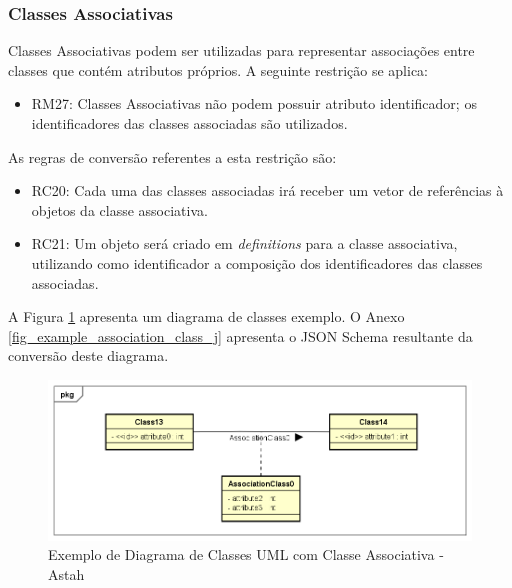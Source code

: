 
\subsubsection{Classes Associativas}

Classes Associativas podem ser utilizadas para representar associações entre classes que contém atributos próprios. A seguinte restrição se aplica:

\begin{itemize}
    \item RM27: Classes Associativas não podem possuir atributo identificador; os identificadores das classes associadas são utilizados.
\end{itemize}

As regras de conversão referentes a esta restrição são:

\begin{itemize}
    \item RC20: Cada uma das classes associadas irá receber um vetor de referências à objetos da classe associativa.
    
    \item RC21: Um objeto será criado em \textit{definitions} para a classe associativa, utilizando como identificador a composição dos identificadores das classes associadas.
\end{itemize}

A Figura \ref{fig_example_association_class} apresenta um diagrama de classes exemplo. O Anexo \ref{fig_example_association_class_j} apresenta o JSON Schema resultante da conversão deste diagrama.

\begin{figure}
    \begin{center}
        \includegraphics[scale=0.7]{imagens/Example_Association_Class.png}
    \end{center}
	\caption{\label{fig_example_association_class}Exemplo de Diagrama de Classes UML com Classe Associativa - Astah}
\end{figure}

